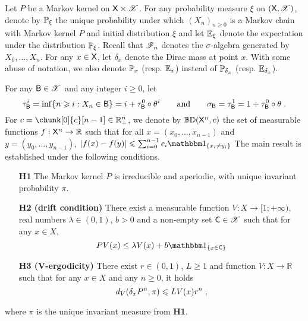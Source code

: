 \documentclass[leqno,11pt,a4paper]{article}
\begin{document}
Let $P$ be a Markov kernel on $\mathsf{X} \times \mathscr{X}$.
For any probability measure $\xi$ on $(\mathsf{X},\mathscr{X})$, denote by $\mathbb{P}_{\xi}$  the unique probability under which $(X_n)_{n\geqslant 0}$ is a Markov chain with Markov kernel $P$ and initial distribution $\xi$ and let $\mathbb{E}_{\xi}$ denote the expectation under the distribution $\mathbb{P}_{\xi}$.
Recall that $\mathscr{F}_n$ denotes the $\sigma$-algebra generated by $X_0, \ldots,X_n$.
For any $x\in \mathsf{X}$, let $\delta_x$ denote the Dirac mass at point $x$.
With some abuse of notation, we also denote $\mathbb{P}_x$ (resp. $\mathbb{E}_x$) instead of $\mathbb{P}_{\delta_x}$ (resp. $\mathbb{E}_{\delta_x}$).

For any $\mathsf{B}\in \mathscr{X}$ and any integer $i\geqslant 0$, let
\[
\tau_{\mathsf{B}}^i=\inf\{n\geqslant i: X_n\in \mathsf{B}\}=i+\tau_{\mathsf{B}}^0\circ \theta^i
\qquad \text{and} \qquad
\sigma_{\mathsf{B}}=\tau_{\mathsf{B}}^1=1+\tau_{\mathsf{B}}^0\circ \theta\;.
\]
For $c = \chunk[0]{c}[n-1] \in \R_+^n$, we denote by  $\mathbb{BD}(\mathsf{X}^n,c)$  the set of measurable functions $f:\mathsf{X}^n\to\mathbb{R}$ such that for all $x= (x_0,\dots,x_{n-1})$ and $y= (y_0,\dots,y_{n-1})$, $|f(x)-f(y)|\leqslant \sum_{i=0}^{n-1} c_i\indiacc{x_i\ne y_i}$
The main result is established under the following conditions.
\begin{itemize}
\item[{\bf H1}] The Markov kernel $P$ is irreducible and aperiodic, with unique invariant probability $\pi$.
\item[{\bf H2 (drift condition)}] There exist a measurable function $V: X \rightarrow [1; +\infty)$, real numbers $\lambda \in (0,1)$, $b > 0$ and a non-empty set $\mathsf{C} \in \mathscr{X}$ such that for any $x \in X$,
\[
PV(x) \leq \lambda V(x) + b\indiacc{x \in \cC}
\]
\item[{\bf H3 (V-ergodicity)}] There exist $r \in (0,1)$, $L \geqslant 1$ and function $V: X \rightarrow \mathbb{R}$ such that for any $x  \in  X$ and any $n \geqslant 0$, it holds
\[
d_V(\delta_xP^n,\pi) \leqslant L V(x) r^n\;,
\]
\end{itemize}
where $\pi$ is the unique invariant measure from {\bf H1}.
\end{document}
